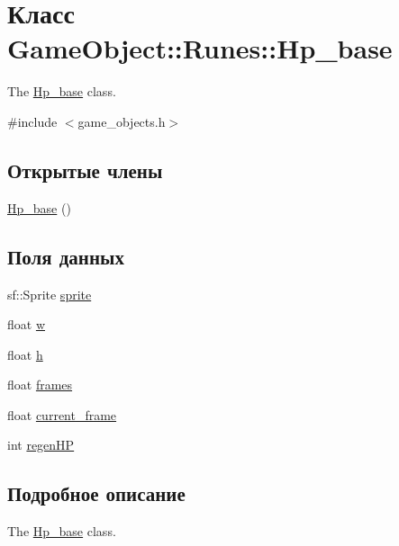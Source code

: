 \hypertarget{classGameObject_1_1Runes_1_1Hp__base}{}\section{Класс Game\+Object\+:\+:Runes\+:\+:Hp\+\_\+base}
\label{classGameObject_1_1Runes_1_1Hp__base}


The \hyperlink{classGameObject_1_1Runes_1_1Hp__base}{Hp\+\_\+base} class.  




{\ttfamily \#include $<$game\+\_\+objects.\+h$>$}

\subsection*{Открытые члены}
\begin{DoxyCompactItemize}
\item 
\hyperlink{classGameObject_1_1Runes_1_1Hp__base_af2eaac200783be6060f53e2fc1dd317a}{Hp\+\_\+base} ()
\end{DoxyCompactItemize}
\subsection*{Поля данных}
\begin{DoxyCompactItemize}
\item 
sf\+::\+Sprite \hyperlink{classGameObject_1_1Runes_1_1Hp__base_aaee646db3a5ea04462ae77a08c475d16}{sprite}
\item 
float \hyperlink{classGameObject_1_1Runes_1_1Hp__base_a57360af5bfe84e33fddfc5c41a7c9c91}{w}
\item 
float \hyperlink{classGameObject_1_1Runes_1_1Hp__base_abeffb8fe7917662111a77cf70c25fae5}{h}
\item 
float \hyperlink{classGameObject_1_1Runes_1_1Hp__base_a6cd250a0e85ad0449365f33d452c6e28}{frames}
\item 
float \hyperlink{classGameObject_1_1Runes_1_1Hp__base_a6019c25a6c56252b3a059d537b80b798}{current\+\_\+frame}
\item 
int \hyperlink{classGameObject_1_1Runes_1_1Hp__base_ae6d1b0b8a2aa0ae71e7c26fff65b263c}{regen\+HP}
\end{DoxyCompactItemize}


\subsection{Подробное описание}
The \hyperlink{classGameObject_1_1Runes_1_1Hp__base}{Hp\+\_\+base} class. 

